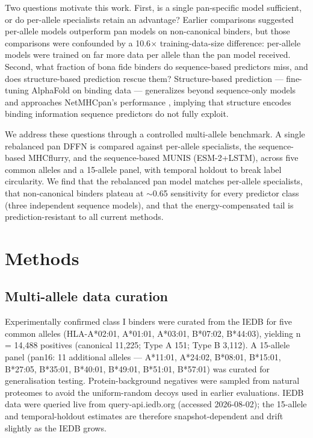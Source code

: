 \documentclass[10pt]{article}
\begin{document}
Two questions motivate this work. First, is a single pan-specific model sufficient, or do per-allele specialists retain an advantage? Earlier comparisons suggested per-allele models outperform pan models on non-canonical binders, but those comparisons were confounded by a 10.6$\times$ training-data-size difference: per-allele models were trained on far more data per allele than the pan model received. Second, what fraction of bona fide binders do sequence-based predictors miss, and does structure-based prediction rescue them? Structure-based prediction --- fine-tuning AlphaFold on binding data --- generalizes beyond sequence-only models and approaches NetMHCpan's performance \cite{Motmaen23}, implying that structure encodes binding information sequence predictors do not fully exploit.

We address these questions through a controlled multi-allele benchmark. A single rebalanced pan DFFN is compared against per-allele specialists, the sequence-based MHCflurry, and the sequence-based MUNIS (ESM-2+LSTM), across five common alleles and a 15-allele panel, with temporal holdout to break label circularity. We find that the rebalanced pan model matches per-allele specialists, that non-canonical binders plateau at $\sim$0.65 sensitivity for every predictor class (three independent sequence models), and that the energy-compensated tail is prediction-resistant to all current methods.

\section{Methods}
\subsection{Multi-allele data curation}
Experimentally confirmed class I binders were curated from the IEDB \cite{Vita19} for five common alleles (HLA-A*02:01, A*01:01, A*03:01, B*07:02, B*44:03), yielding n = 14,488 positives (canonical 11,225; Type A 151; Type B 3,112). A 15-allele panel (pan16: 11 additional alleles --- A*11:01, A*24:02, B*08:01, B*15:01, B*27:05, B*35:01, B*40:01, B*49:01, B*51:01, B*57:01) was curated for generalisation testing. Protein-background negatives were sampled from natural proteomes to avoid the uniform-random decoys used in earlier evaluations. IEDB data were queried live from query-api.iedb.org (accessed 2026-08-02); the 15-allele and temporal-holdout estimates are therefore snapshot-dependent and drift slightly as the IEDB grows.
\end{document}

